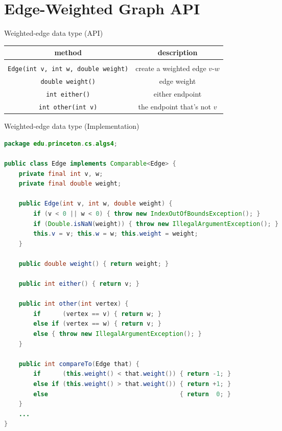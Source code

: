 \documentclass[8pt,a4paper,compress]{beamer}
\begin{document}
\section{Edge-Weighted Graph API}
\begin{frame}[fragile]
Weighted-edge data type (API)
\begin{center}
\begin{tabular}{cc}
method & description \\ \hline \\
\lstinline$Edge(int v, int w, double weight)$ & create a weighted edge $v$-$w$ \\
\lstinline$double weight()$ & edge weight \\
\lstinline$int either()$ & either endpoint \\
\lstinline$int other(int v)$ & the endpoint that's not $v$
\end{tabular}  
\end{center}
\end{frame}

\begin{frame}[fragile]
Weighted-edge data type (Implementation)
\begin{lstlisting}[language=Java]
package edu.princeton.cs.algs4;

public class Edge implements Comparable<Edge> {
    private final int v, w;
    private final double weight;

    public Edge(int v, int w, double weight) {
        if (v < 0 || w < 0) { throw new IndexOutOfBoundsException(); }
        if (Double.isNaN(weight)) { throw new IllegalArgumentException(); }
        this.v = v; this.w = w; this.weight = weight;
    }

    public double weight() { return weight; }

    public int either() { return v; }

    public int other(int vertex) {
        if      (vertex == v) { return w; }
        else if (vertex == w) { return v; }
        else { throw new IllegalArgumentException(); }
    }

    public int compareTo(Edge that) {
        if      (this.weight() < that.weight()) { return -1; }
        else if (this.weight() > that.weight()) { return +1; }
        else                                    { return  0; }
    }
    ...
}
\end{lstlisting}
\end{frame}
\end{document}
